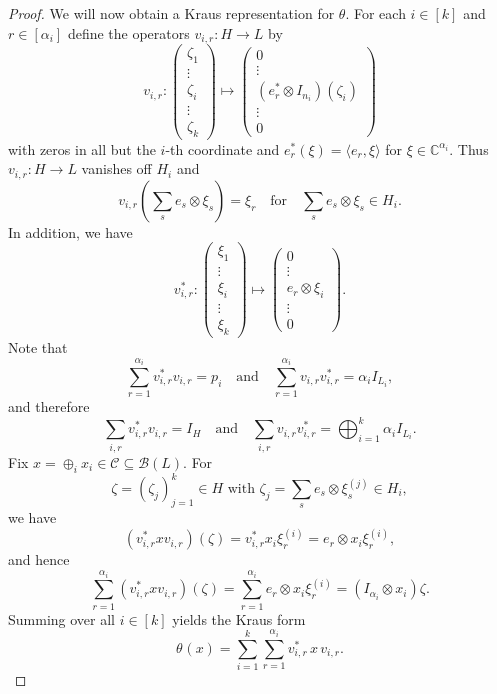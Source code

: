 \documentclass[11pt]{amsart}
\numberwithin{equation}{section}
\theoremstyle{plain}
\theoremstyle{definition}
\theoremstyle{remark}
\newcommand{\B}{{\mathcal{B}}}
\newcommand{\C}{{\mathcal{C}}}
\def\al{\alpha}
\newcommand{\bC}{\mathbb{C}}
\newcommand{\qand}{\quad\text{and}\quad}
\begin{document}
\begin{proof}
We will now obtain a Kraus representation for $\theta$. For each $i\in [k]$ and $r\in[\al_i]$ define the operators $ v_{i,r}: H \to L$ by 
\[
v_{i,r}:\begin{pmatrix}
\zeta_1\\
\vdots\\
\zeta_i\\
\vdots\\
\zeta_k
\end{pmatrix} \mapsto \begin{pmatrix}
0 \\
\vdots \\
(e_r^* \otimes I_{n_i})(\zeta_i)\\
\vdots\\
0
\end{pmatrix}
\]
with zeros in all but the $i$-th coordinate and $e_r^*(\xi)=\langle e_r,\xi \rangle$ for $ \xi \in \bC^{\alpha_i}$.   Thus  $v_{i,r} \colon H\to L$ vanishes off $H_i$ and  
\[
v_{i,r}(\sum_s e_s\otimes\xi_s)=\xi_r \quad  \text{for} \quad \sum_s e_s\otimes\xi_s\in H_i.
\]
In addition, we have
\[
v_{i,r}^* : \begin{pmatrix}
\xi_1\\
\vdots\\
\xi_i\\
\vdots\\
\xi_k
\end{pmatrix} \mapsto \begin{pmatrix}
0 \\
\vdots\\
e_r \otimes \xi_i\\
\vdots\\
0
\end{pmatrix}.
\]
Note that
\[
\sum_{r=1}^{\alpha_i} v_{i,r}^*v_{i,r}=p_i
\qand
\sum_{r=1}^{\alpha_i} v_{i,r}v_{i,r}^*=\alpha_i I_{L_i},
\]
and therefore
\[
\sum_{i,r} v_{i,r}^*v_{i,r}=I_H
\qand
\sum_{i,r} v_{i,r}v_{i,r}^*=\bigoplus_{i=1}^k \alpha_i I_{L_i}.
\]
Fix $x=\oplus_i x_i\in\C\subseteq \B(L)$.
For 
\[
\zeta= (\zeta_j)_{j=1}^k\in H \text{ with }  \zeta_j=\sum_{s}e_s\otimes\xi_s^{(j)}\in H_i,
\]
we have
\[
(v_{i,r}^*xv_{i,r})(\zeta)= v_{i,r}^* 
x_i \xi_r^{(i)} = 
e_r \otimes x_i \xi_r^{(i)},
\]
and hence
\[
\sum_{r=1}^{\alpha_i} (v_{i,r}^*xv_{i,r})(\zeta)
=
\sum_{r=1}^{\alpha_i} e_r\otimes x_i\xi_r^{(i)}
=
(I_{\alpha_i}\otimes x_i)\zeta.
\]
Summing over all $i\in [k]$ yields the Kraus form
\[
\theta_{}(x)=\sum_{i=1}^k\sum_{r=1}^{\alpha_i} v_{i,r}^*\,x\,v_{i,r}.
\]


\end{proof}
\end{document}
